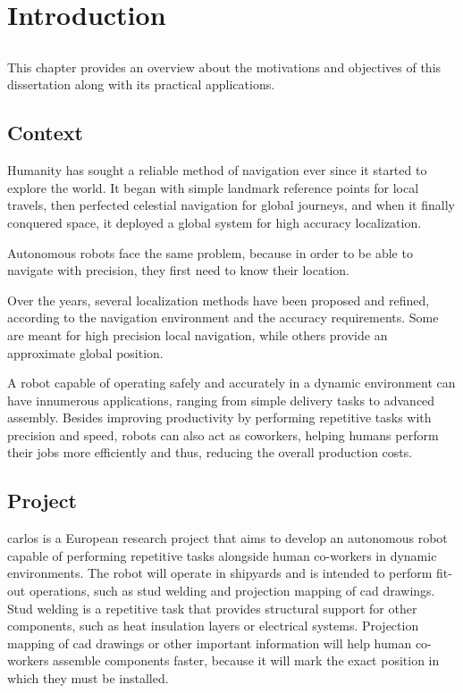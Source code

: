 \chapter{Introduction} \label{chap:introduction}



\section*{}

This chapter provides an overview about the motivations and objectives of this dissertation along with its practical applications.



\section{Context} \label{sec:introduction_context}

Humanity has sought a reliable method of navigation ever since it started to explore the world. It began with simple landmark reference points for local travels, then perfected celestial navigation for global journeys, and when it finally conquered space, it deployed a global system for high accuracy localization.

Autonomous robots face the same problem, because in order to be able to navigate with precision, they first need to know their location.

Over the years, several localization methods have been proposed and refined, according to the navigation environment and the accuracy requirements. Some are meant for high precision local navigation, while others provide an approximate global position.

A robot capable of operating safely and accurately in a dynamic environment can have innumerous applications, ranging from simple delivery tasks to advanced assembly. Besides improving productivity by performing repetitive tasks with precision and speed, robots can also act as coworkers, helping humans perform their jobs more efficiently and thus, reducing the overall production costs.



\section{Project} \label{sec:introduction_project}

\gls{carlos} is a European research project that aims to develop an autonomous robot capable of performing repetitive tasks alongside human co-workers in dynamic environments. The robot will operate in shipyards and is intended to perform fit-out operations, such as stud welding and projection mapping of \gls{cad} drawings. Stud welding is a repetitive task that provides structural support for other components, such as heat insulation layers or electrical systems. Projection mapping of \gls{cad} drawings or other important information will help human co-workers assemble components faster, because it will mark the exact position in which they must be installed.



